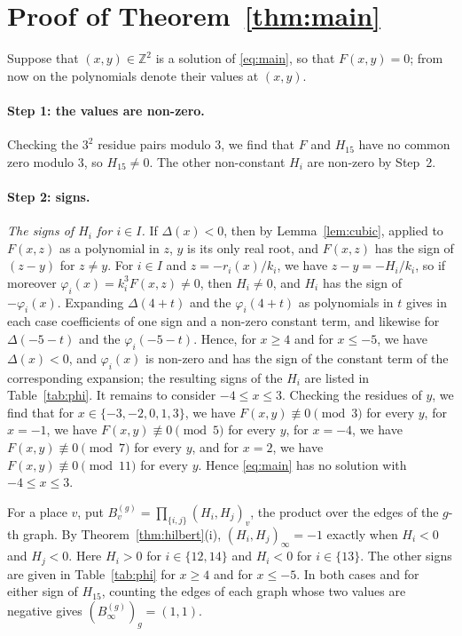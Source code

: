 \documentclass[11pt]{article}
\newcommand{\Z}{\mathbb{Z}}
\begin{document}
\section{Proof of Theorem~\ref{thm:main}}

Suppose that $(x,y)\in\Z^2$ is a solution of \eqref{eq:main}, so that $F(x,y)=0$; from now on the polynomials denote their values at $(x,y)$.
\paragraph{Step 1: the values are non-zero.} Checking the $3^2$ residue pairs modulo $3$, we find that $F$ and $H_{15}$ have no common zero modulo $3$, so $H_{15}\neq0$. The other non-constant $H_i$ are non-zero by Step~2.

\paragraph{Step 2: signs.} \emph{The signs of $H_i$ for $i\in I$.} If $\Delta(x)<0$, then by Lemma~\ref{lem:cubic}, applied to $F(x,z)$ as a polynomial in $z$, $y$ is its only real root, and $F(x,z)$ has the sign of $(z-y)$ for $z\neq y$. For $i\in I$ and $z=-r_i(x)/k_i$, we have $z-y=-H_i/k_i$, so if moreover $\varphi_i(x)=k_i^3F(x,z)\neq0$, then $H_i\neq0$, and $H_i$ has the sign of $-\varphi_i(x)$. Expanding $\Delta(4+t)$ and the $\varphi_i(4+t)$ as polynomials in $t$ gives in each case coefficients of one sign and a non-zero constant term, and likewise for $\Delta(-5-t)$ and the $\varphi_i(-5-t)$. Hence, for $x\geq4$ and for $x\leq-5$, we have $\Delta(x)<0$, and $\varphi_i(x)$ is non-zero and has the sign of the constant term of the corresponding expansion; the resulting signs of the $H_i$ are listed in Table~\ref{tab:phi}. It remains to consider $-4\leq x\leq3$. Checking the residues of $y$, we find that for $x\in\{-3,\allowbreak -2,\allowbreak 0,\allowbreak 1,\allowbreak 3\}$, we have $F(x,y)\not\equiv0\pmod{3}$ for every $y$, for $x=-1$, we have $F(x,y)\not\equiv0\pmod{5}$ for every $y$, for $x=-4$, we have $F(x,y)\not\equiv0\pmod{7}$ for every $y$, and for $x=2$, we have $F(x,y)\not\equiv0\pmod{11}$ for every $y$. Hence \eqref{eq:main} has no solution with $-4\leq x\leq3$.

For a place $v$, put $B^{(g)}_v=\prod_{\{i,j\}}(H_i,H_j)_v$, the product over the edges of the $g$-th graph. By Theorem~\ref{thm:hilbert}(i), $(H_i,H_j)_\infty=-1$ exactly when $H_i<0$ and $H_j<0$. Here $H_i>0$ for $i\in\{12,\allowbreak 14\}$ and $H_i<0$ for $i\in\{13\}$. The other signs are given in Table~\ref{tab:phi} for $x\geq4$ and for $x\leq-5$. In both cases and for either sign of $H_{15}$, counting the edges of each graph whose two values are negative gives $(B^{(g)}_\infty)_g=(1,1)$.
\end{document}
